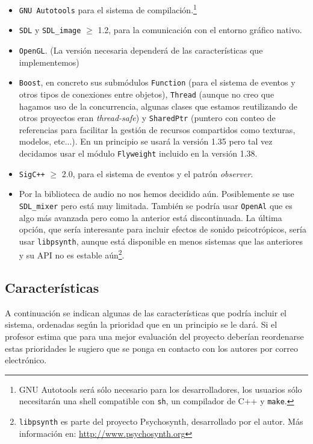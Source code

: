 \documentclass[a4paper,10pt,spanish]{article}
\begin{document}
\begin{description}
\begin{itemize}
\item \texttt{GNU Autotools} para el sistema de compilación.\footnote{GNU Autotools será sólo necesario para los desarrolladores, los usuarios sólo necesitarán una shell compatible con \texttt{sh}, un compilador de C++ y \texttt{make}.}
\item \texttt{SDL} y \texttt{SDL\_image} $\geq$ 1.2, para la comunicación con el entorno gráfico nativo.
\item \texttt{OpenGL}. (La versión necesaria dependerá de las características que implementemos)
\item \texttt{Boost}, en concreto sus submódulos \texttt{Function} (para el sistema de eventos y otros tipos de conexiones entre objetos), \texttt{Thread} (aunque no creo que hagamos uso de la concurrencia, algunas clases que estamos reutilizando de otros proyectos eran \emph{thread-safe}) y \texttt{SharedPtr} (puntero con conteo de referencias para facilitar la gestión de recursos compartidos como texturas, modelos, etc...). En un principio se usará la versión 1.35 pero tal vez decidamos usar el módulo \texttt{Flyweight} incluido en la versión 1.38.
\item \texttt{SigC++} $\geq$ 2.0, para el sistema de eventos y el patrón \emph{observer}.
\item Por la biblioteca de audio no nos hemos decidido aún. Posiblemente se use \texttt{SDL\_mixer} pero está muy limitada. También se podría usar \texttt{OpenAl} que es algo más avanzada pero como la anterior está discontinuada. La última opción, que sería interesante para incluir efectos de sonido psicotrópicos, sería usar \texttt{libpsynth}, aunque está disponible en menos sistemas que las anteriores y su API no es estable aún\footnote{\texttt{libpsynth} es parte del proyecto Psychosynth, desarrollado por el autor. Más información en: \url{http://www.psychosynth.org}}.
\end{itemize}

\subsection{Características}

A continuación se indican algunas de las características que podría incluir el sistema, ordenadas según la prioridad que en un principio se le dará. Si el profesor estima que para una mejor evaluación del proyecto deberían reordenarse estas prioridades le sugiero que se ponga en contacto con los autores por correo electrónico.


\end{description}
\end{document}

